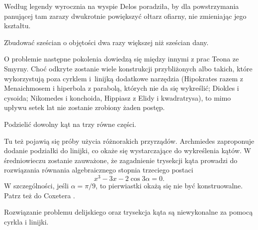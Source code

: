 Według legendy wyrocznia na wyspie Delos poradziła, by dla powstrzymania panującej tam zarazy dwukrotnie powiększyć ołtarz ofiarny, nie zmieniając jego kształtu.

\begin{problem}
    Zbudować sześcian o objętości dwa razy większej niż sześcian dany.
\end{problem}

O problemie następne pokolenia dowiedzą się między innymi z prac Teona ze Smyrny.
%
Choć odkryte zostanie wiele konstrukcji przybliżonych albo takich, które wykorzystują poza cyrklem i~linijką dodatkowe narzędzia (Hipokrates razem z Menaichmosem i hiperbola z parabolą, których nie da się wykreślić; Diokles i cysoida; Nikomedes i konchoida, Hippiasz z Elidy i kwadratrysa), to mimo upływu setek lat nie zostanie zrobiony żaden postęp.
%
%
%
%
%
%
%
%
%
%

\begin{problem}
    Podzielić dowolny kąt na trzy równe części.
\end{problem}

Tu też pojawią się próby użycia różnorakich przyrządów.
Archmiedes zaproponuje dodanie podziałki do linijki, co okaże się wystarczające do wykreślenia kątów.
W średniowieczu zostanie zauważone, że zagadnienie trysekcji kąta prowadzi do rozwiązania równania algebraicznego stopnia trzeciego postaci
\begin{equation}
    x^3 - 3 x - 2 \cos 3\alpha = 0.
\end{equation}
W szczególności, jeśli $\alpha = \pi / 9$, to pierwiastki okażą się nie być konstruowalne.
Patrz też do Coxetera \cite[s. 44]{coxeter_1967}.

\begin{proposition}
    Rozwiązanie problemu delijskiego oraz trysekcja kąta są niewykonalne za pomocą cyrkla i linijki.
\end{proposition}

